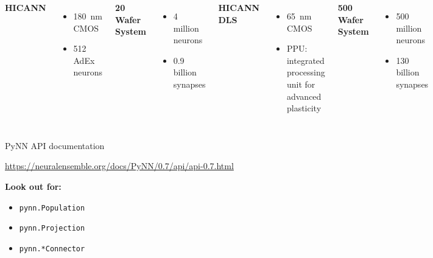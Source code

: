 \documentclass[aspectratio=169]{beamer}
\begin{document}
{\begin{frame}[fragile]
\begin{columns}[T]
		\column{0.2\paperwidth}
		\begin{center}
			\textbf{\color{mDarkTeal}HICANN}
		\end{center}
		\begin{itemize}
				\item \SI{180}{\nano\meter} CMOS
				\item 512 AdEx neurons
		\end{itemize}
		
		\column{0.2\paperwidth}
		\begin{center}
			\textbf{\color{mDarkTeal}20 Wafer System}
		\end{center}
		\begin{itemize}
			\item 4 million neurons
			\item 0.9 billion synapses
		\end{itemize}
		
		\column{0.2\paperwidth}
		\begin{center}
			\textbf{\color{mDarkTeal}HICANN DLS}
		\end{center}
		\begin{itemize}
			\item \SI{65}{\nano\meter} CMOS
			\item PPU: integrated processing unit for advanced plasticity
		\end{itemize}
		
		\column{0.2\paperwidth}
		\begin{center}
			\textbf{\color{mDarkTeal}500 Wafer System}
		\end{center}
		\begin{itemize}
			\item 500 million neurons
			\item 130 billion synapses
		\end{itemize}
	\end{columns}
\end{frame}
}

\begin{frame}{PyNN API documentation}
	\begin{center}
		\url{https://neuralensemble.org/docs/PyNN/0.7/api/api-0.7.html}
	\end{center}

	\vspace{3ex}

	\textbf{Look out for:}
	\begin{itemize}
		\item \texttt{pynn.Population}
		\item \texttt{pynn.Projection}
		\item \texttt{pynn.*Connector}
	\end{itemize}
\end{frame}
\end{document}
